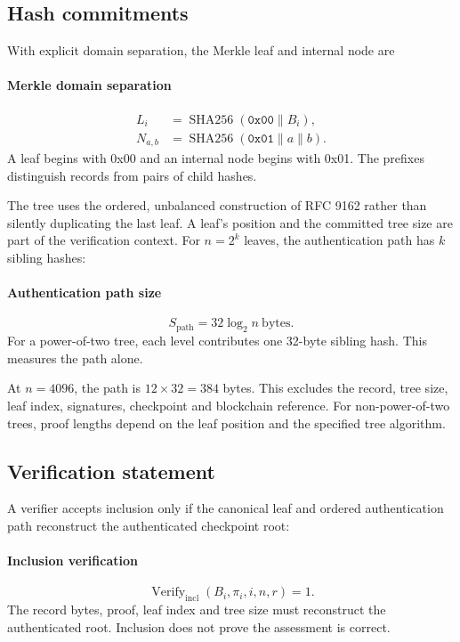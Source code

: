 \documentclass[10pt,a4paper]{article}
\begin{document}
\subsection*{Hash commitments}
With explicit domain separation, the Merkle leaf and internal node are


\paragraph{Merkle domain separation}
\[\begin{aligned}L_i&=\operatorname{SHA256}(\mathtt{0x00}\parallel B_i),\\N_{a,b}&=\operatorname{SHA256}(\mathtt{0x01}\parallel a\parallel b).\end{aligned}\]
A leaf begins with 0x00 and an internal node begins with 0x01. The prefixes distinguish records from pairs of child hashes.


The tree uses the ordered, unbalanced construction of RFC 9162 rather than silently duplicating the last leaf. A leaf's position and the committed tree size are part of the verification context. For \(n=2^k\) leaves, the authentication path has \(k\) sibling hashes:


\paragraph{Authentication path size}
\[S_{\mathrm{path}}=32\log_2 n\ \mathrm{bytes}.\]
For a power-of-two tree, each level contributes one 32-byte sibling hash. This measures the path alone.


At \(n=4096\), the path is \(12\times32=384\) bytes. This excludes the record, tree size, leaf index, signatures, checkpoint and blockchain reference. For non-power-of-two trees, proof lengths depend on the leaf position and the specified tree algorithm.


\subsection*{Verification statement}
A verifier accepts inclusion only if the canonical leaf and ordered authentication path reconstruct the authenticated checkpoint root:


\paragraph{Inclusion verification}
\[\operatorname{Verify}_{\mathrm{incl}}(B_i,\pi_i,i,n,r)=1.\]
The record bytes, proof, leaf index and tree size must reconstruct the authenticated root. Inclusion does not prove the assessment is correct.
\end{document}
